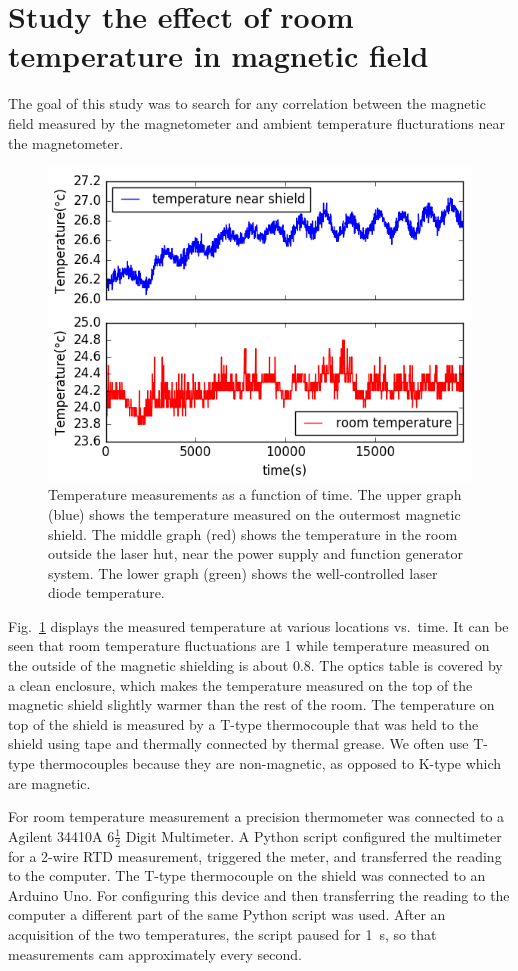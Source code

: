 \section{Study the effect of room temperature in magnetic field} 

The goal of this study was to search for any correlation between the
magnetic field measured by the magnetometer and ambient temperature
flucturations near the magnetometer.

\begin{figure}%
\centering\includegraphics[width=0.8\linewidth]{figures/temp_.png}
\caption{Temperature measurements as a function of time.  The upper
  graph (blue) shows the temperature measured on the outermost
  magnetic shield.  The middle graph (red) shows the temperature in
  the room outside the laser hut, near the power supply and function
  generator system.  The lower graph (green) shows the well-controlled
  laser diode temperature.\label{fig:temperature-measurement}}
\end{figure}

Fig.~\ref{fig:temperature-measurement} displays the measured
temperature at various locations vs.~time.  It can be seen that room
temperature fluctuations are 1 while temperature measured on
the outside of the magnetic shielding is about 0.8.  The
optics table is covered by a clean enclosure, which makes the
temperature measured on the top of the magnetic shield slightly warmer
than the rest of the room.  The temperature on top of the shield is
measured by a T-type thermocouple that was held to the shield using
tape and thermally connected by thermal grease.  We often use T-type
thermocouples because they are non-magnetic, as opposed to K-type
which are magnetic.

For room temperature measurement a precision thermometer was connected
to a Agilent 34410A 6$\frac{1}{2}$ Digit Multimeter.  A Python script
configured the multimeter for a 2-wire RTD measurement, triggered the
meter, and transferred the reading to the computer.  The T-type
thermocouple on the shield was connected to an Arduino Uno.  For
configuring this device and then transferring the reading to the
computer a different part of the same Python script was used.  After
an acquisition of the two temperatures, the script paused for 1~s, so
that measurements cam approximately every second.

